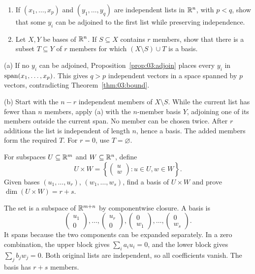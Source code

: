 \begin{problem}\label{ex:03:exchange}
\begin{enumerate}
\item If \((x_1,\ldots,x_p)\) and \((y_1,\ldots,y_q)\) are independent
lists in \(\mathbb R^n\), with \(p<q\), show that some \(y_i\) can be adjoined
to the first list while preserving independence.
\item Let \(X,Y\) be bases of \(\mathbb R^n\). If \(S\subseteq X\) contains
\(r\) members, show that there is a subset \(T\subseteq Y\) of \(r\)
members for which \((X\setminus S)\cup T\) is a basis.
\end{enumerate}
\end{problem}
\begin{solution}
(a) If no \(y_i\) can be adjoined, Proposition~\ref{prop:03:adjoin} places
every \(y_i\) in \(\operatorname{span}(x_1,\ldots,x_p)\).
This gives \(q>p\) independent vectors in a space spanned by \(p\) vectors,
contradicting Theorem~\ref{thm:03:bound}.

(b) Start with the \(n-r\) independent members of \(X\setminus S\).
While the current list has fewer than \(n\) members, apply (a) with
the \(n\)-member basis \(Y\), adjoining one of its members outside
the current span. No member can be chosen twice.
After \(r\) additions the list is independent of length \(n\), hence a basis.
The added members form the required \(T\). For \(r=0\), use \(T=\varnothing\).
\end{solution}

\begin{problem}\label{ex:03:product-space}
For subspaces \(U\subseteq\mathbb R^m\) and \(W\subseteq\mathbb R^n\), define
\[
U\times W=\left\{\begin{pmatrix}u\\w\end{pmatrix}:u\in U, w\in W\right\}.
\]
Given bases \((u_1,\ldots,u_r)\), \((w_1,\ldots,w_s)\), find a basis of
\(U\times W\) and prove \(\dim(U\times W)=r+s\).
\end{problem}
\begin{solution}
The set is a subspace of \(\mathbb R^{m+n}\) by componentwise closure.
A basis is
\[
\begin{pmatrix}u_1\\0\end{pmatrix},\ldots,\begin{pmatrix}u_r\\0\end{pmatrix},
\begin{pmatrix}0\\w_1\end{pmatrix},\ldots,\begin{pmatrix}0\\w_s\end{pmatrix}.
\]
It spans because the two components can be expanded separately.
In a zero combination, the upper block gives \(\sum_i a_iu_i=0\),
and the lower block gives \(\sum_j b_jw_j=0\). Both original lists
are independent, so all coefficients vanish. The basis has \(r+s\) members.
\end{solution}

